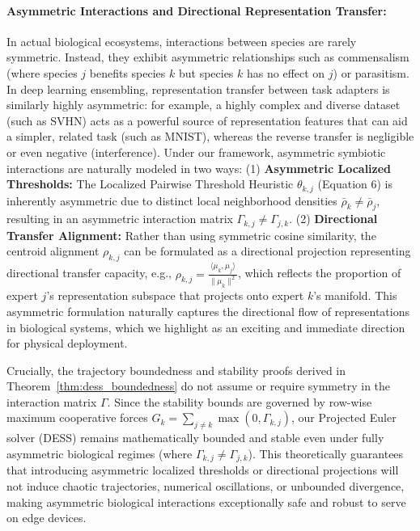 \paragraph{Asymmetric Interactions and Directional Representation Transfer:}
In actual biological ecosystems, interactions between species are rarely symmetric. Instead, they exhibit asymmetric relationships such as commensalism (where species $j$ benefits species $k$ but species $k$ has no effect on $j$) or parasitism. In deep learning ensembling, representation transfer between task adapters is similarly highly asymmetric: for example, a highly complex and diverse dataset (such as SVHN) acts as a powerful source of representation features that can aid a simpler, related task (such as MNIST), whereas the reverse transfer is negligible or even negative (interference). Under our framework, asymmetric symbiotic interactions are naturally modeled in two ways:
(1) \textbf{Asymmetric Localized Thresholds:} The Localized Pairwise Threshold Heuristic $\theta_{k, j}$ (Equation 6) is inherently asymmetric due to distinct local neighborhood densities $\bar{\rho}_k \neq \bar{\rho}_j$, resulting in an asymmetric interaction matrix $\Gamma_{k, j} \neq \Gamma_{j, k}$.
(2) \textbf{Directional Transfer Alignment:} Rather than using symmetric cosine similarity, the centroid alignment $\rho_{k, j}$ can be formulated as a directional projection representing directional transfer capacity, e.g., $\rho_{k, j} = \frac{\langle \mu_k, \mu_j \rangle}{\|\mu_k\|^2}$, which reflects the proportion of expert $j$'s representation subspace that projects onto expert $k$'s manifold. This asymmetric formulation naturally captures the directional flow of representations in biological systems, which we highlight as an exciting and immediate direction for physical deployment.

Crucially, the trajectory boundedness and stability proofs derived in Theorem~\ref{thm:dess_boundedness} do not assume or require symmetry in the interaction matrix $\Gamma$. Since the stability bounds are governed by row-wise maximum cooperative forces $G_k = \sum_{j \neq k} \max(0, \Gamma_{k, j})$, our Projected Euler solver (DESS) remains mathematically bounded and stable even under fully asymmetric biological regimes (where $\Gamma_{k, j} \neq \Gamma_{j, k}$). This theoretically guarantees that introducing asymmetric localized thresholds or directional projections will not induce chaotic trajectories, numerical oscillations, or unbounded divergence, making asymmetric biological interactions exceptionally safe and robust to serve on edge devices.

